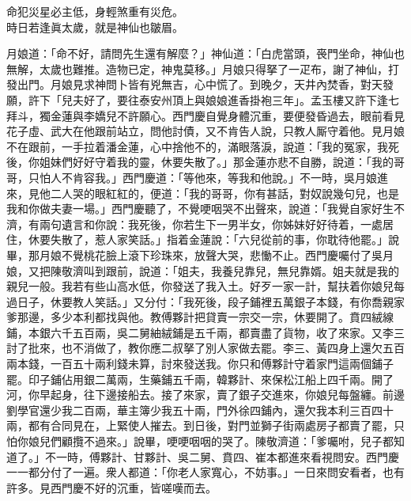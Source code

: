 \begin{myquote} 
命犯災星必主低，身輕煞重有災危。\\時日若逢眞太歲，就是神仙也皺眉。
\end{myquote} 

月娘道：「命不好，請問先生還有解麼？」神仙道：「白虎當頭，䘮門坐命，神仙也無解，太歲也難推。造物已定，神鬼莫移。」月娘只得拏了一疋布，謝了神仙，打發出門。月娘見求神問卜皆有兇無吉，心中慌了。到晚夕，天井內焚香，對天發願，許下「兒夫好了，要往泰安州頂上與娘娘進香掛袍三年」。孟玉樓又許下逢七拜斗，{}獨金蓮與李嬌兒不許願心。{}西門慶自覺身體沉重，要便發昏過去，眼前看見花子虛、武大在他跟前站立，問他討債，又不肯告人說，只教人厮守着他。見月娘不在跟前，一手拉着潘金蓮，心中捨他不的，滿眼落淚，說道：「我的冤家，我死後，你姐妹們好好守着我的靈，休要失散了。」{}那金蓮亦悲不自勝，說道：「我的哥哥，只怕人不肯容我。」西門慶道：「等他來，等我和他說。」不一時，吳月娘進來，見他二人哭的眼紅紅的，便道：「我的哥哥，你有甚話，對奴說幾句兒，也是我和你做夫妻一場。」{}西門慶聽了，不覺哽咽哭不出聲來，說道：「我覺自家好生不濟，有兩句遺言和你說：我死後，你若生下一男半女，你姊妹好好待着，一處居住，休要失散了，惹人家笑話。」指着金蓮說：「六兒從前的事，你耽待他罷。」說畢，那月娘不覺桃花臉上滾下珍珠來，放聲大哭，悲慟不止。西門慶囑付了吳月娘，又把陳敬濟叫到跟前，說道：「姐夫，我養兒靠兒，無兒靠婿。姐夫就是我的親兒一般。{}我若有些山高水低，你發送了我入土。好歹一家一計，幫扶着你娘兒每過日子，休要教人笑話。」又分付：「我死後，段子鋪裡五萬銀子本錢，有你喬親家爹那邊，多少本利都找與他。教傅夥計把貸賣一宗交一宗，休要開了。賁四絨線鋪，本銀六千五百兩，吳二舅紬絨鋪是五千兩，都賣盡了貨物，收了來家。又李三討了批來，也不消做了，教你應二叔拏了別人家做去罷。李三、黃四身上還欠五百兩本錢，一百五十兩利錢未算，討來發送我。你只和傅夥計守着家門這兩個鋪子罷。印子鋪佔用銀二萬兩，生藥鋪五千兩，韓夥計、來保松江船上四千兩。開了河，你早起身，往下邊接船去。接了來家，賣了銀子交進來，你娘兒每盤纏。前邊劉學官還少我二百兩，華主簿少我五十兩，門外徐四鋪內，還欠我本利三百四十兩，都有合同見在，上緊使人摧去。到日後，對門並獅子街兩處房子都賣了罷，只怕你娘兒們顧攬不過來。」說畢，哽哽咽咽的哭了。{}陳敬濟道：「爹囑咐，兒子都知道了。」不一時，傅夥計、甘夥計、吳二舅、賁四、崔本都進來看視問安。西門慶一一都分付了一遍。衆人都道：「你老人家寬心，不妨事。」一日來問安看者，也有許多。見西門慶不好的沉重，皆嗟嘆而去。

